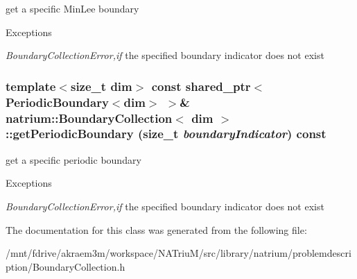 get a specific MinLee boundary 
\begin{DoxyExceptions}{Exceptions}
\item[{\em BoundaryCollectionError,if}]the specified boundary indicator does not exist \end{DoxyExceptions}
\hypertarget{classnatrium_1_1BoundaryCollection_ac3a84114a57f0e321a24eaa743a141f3}{
\subsubsection[{getPeriodicBoundary}]{\setlength{\rightskip}{0pt plus 5cm}template$<$size\_\-t dim$>$ const shared\_\-ptr$<${\bf PeriodicBoundary}$<$dim$>$ $>$\& {\bf natrium::BoundaryCollection}$<$ dim $>$::getPeriodicBoundary (size\_\-t {\em boundaryIndicator}) const}}
\label{classnatrium_1_1BoundaryCollection_ac3a84114a57f0e321a24eaa743a141f3}


get a specific periodic boundary 
\begin{DoxyExceptions}{Exceptions}
\item[{\em BoundaryCollectionError,if}]the specified boundary indicator does not exist \end{DoxyExceptions}


The documentation for this class was generated from the following file:\begin{DoxyCompactItemize}
\item 
/mnt/fdrive/akraem3m/workspace/NATriuM/src/library/natrium/problemdescription/BoundaryCollection.h\end{DoxyCompactItemize}
